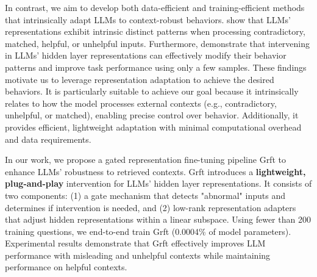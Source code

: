 In contrast, we aim to develop both data-efficient and training-efficient methods that intrinsically adapt LLMs to context-robust behaviors. \citet{zeng2024towards} show that LLMs' representations exhibit intrinsic distinct patterns when processing contradictory, matched, helpful, or unhelpful inputs. Furthermore, \citet{zou2023representation,wuandarora2024reft} demonstrate that intervening in LLMs' hidden layer representations can effectively modify their behavior patterns and improve task performance using only a few samples. These findings motivate us to leverage  representation adaptation to achieve the desired behaviors. It is particularly suitable to achieve our goal because it intrinsically relates to how the model processes external contexts\cite{zeng2024towards} (e.g., contradictory, unhelpful, or matched), enabling precise control over behavior. Additionally, it provides efficient, lightweight adaptation with minimal computational overhead and data requirements\cite{wu2024reft}.

In our work, we propose a gated representation fine-tuning pipeline Grft to enhance LLMs' robustness to retrieved contexts. Grft introduces a \textbf{lightweight, plug-and-play} intervention for LLMs' hidden layer representations. It consists of two components: (1) a gate mechanism that detects "abnormal" inputs and determines if intervention is needed, and (2) low-rank representation adapters that adjust hidden representations within a linear subspace. Using fewer than 200 training questions, we end-to-end train Grft (0.0004\% of model parameters). Experimental results demonstrate that Grft effectively improves LLM performance with misleading and unhelpful contexts while maintaining performance on helpful contexts.





